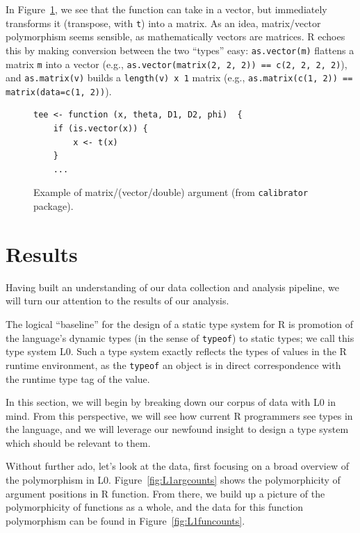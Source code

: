 \documentclass[acmsmall,10pt,review,anonymous]{acmart}\settopmatter{printfolios=true,printccs=false,printacmref=false}
\newcommand{\code}[1]{\lstinline|#1|\xspace}
\begin{document}
In Figure~\ref{fig:matvec}, we see that the function can take in a vector, but immediately transforms it (transpose, with {\tt t}) into a matrix.
As an idea, matrix/vector polymorphism seems sensible, as mathematically vectors are matrices.
R echoes this by making conversion between the two ``types'' easy:
\code{as.vector(m)} flattens a matrix \code{m} into a vector (e.g., \code{as.vector(matrix(2, 2, 2)) == c(2, 2, 2, 2)}), and \code{as.matrix(v)} builds a {\tt length(v) x 1} matrix (e.g., \code{as.matrix(c(1, 2)) == matrix(data=c(1, 2))}).

\begin{figure}[!hb]{\small\begin{lstlisting}[style=R]
tee <- function (x, theta, D1, D2, phi)  {
    if (is.vector(x)) {
        x <- t(x)
    }
    ...
\end{lstlisting}}\caption{Example of matrix/(vector/double) argument (from {\tt calibrator} package).}\label{fig:matvec}\end{figure}

%
%
%
%
%
%
\section{Results}\label{sec:results}

Having built an understanding of our data collection and analysis pipeline, we will turn our attention to the results of our analysis.  

The logical ``baseline'' for the design of a static type system for R is promotion of the language's dynamic types (in the sense of \code{typeof}) to static types; we call this type system L0.
Such a type system exactly reflects the types of values in the R runtime environment, as the \code{typeof} an object is in direct correspondence with the runtime type tag of the value.

In this section, we will begin by breaking down our corpus of data with L0 in mind.
From this perspective, we will see how current R programmers see types in the language, and we will leverage our newfound insight to design a type system which should be relevant to them.

Without further ado, let's look at the data, first focusing on a broad overview of the polymorphism in L0.
Figure~\ref{fig:L1argcounts} shows the polymorphicity of argument positions in R function.
From there, we build up a picture of the polymorphicity of functions as a whole, and the data for this function polymorphism can be found in Figure~\ref{fig:L1funcounts}.
\end{document}
